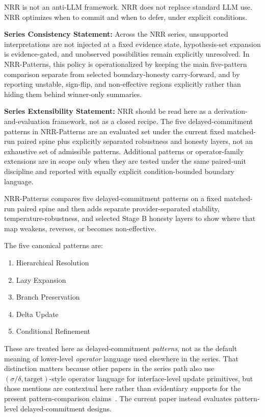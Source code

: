 \documentclass[11pt,a4paper]{article}
\begin{document}
NRR is not an anti-LLM framework.
NRR does not replace standard LLM use.
NRR optimizes when to commit and when to defer, under explicit conditions.

\textbf{Series Consistency Statement:}
Across the NRR series, unsupported interpretations are not injected at a fixed evidence state, hypothesis-set expansion is evidence-gated, and unobserved possibilities remain explicitly unresolved. In NRR-Patterns, this policy is operationalized by keeping the main five-pattern comparison separate from selected boundary-honesty carry-forward, and by reporting unstable, sign-flip, and non-effective regions explicitly rather than hiding them behind winner-only summaries.

\textbf{Series Extensibility Statement:}
NRR should be read here as a derivation-and-evaluation framework, not as a closed recipe. The five delayed-commitment patterns in NRR-Patterns are an evaluated set under the current fixed matched-run paired spine plus explicitly separated robustness and honesty layers, not an exhaustive set of admissible patterns. Additional patterns or operator-family extensions are in scope only when they are tested under the same paired-unit discipline and reported with equally explicit condition-bounded boundary language.

NRR-Patterns compares five delayed-commitment patterns on a fixed matched-run paired spine and then adds separate provider-separated stability, temperature-robustness, and selected Stage B honesty layers to show where that map weakens, reverses, or becomes non-effective.

The five canonical patterns are:
\begin{enumerate}
  \item Hierarchical Resolution
  \item Lazy Expansion
  \item Branch Preservation
  \item Delta Update
  \item Conditional Refinement
\end{enumerate}

These are treated here as delayed-commitment \emph{patterns}, not as the default meaning of lower-level \emph{operator} language used elsewhere in the series. That distinction matters because other papers in the series path also use \((\sigma/\delta,\text{target})\)-style operator language for interface-level update primitives, but those mentions are contextual here rather than evidentiary supports for the present pattern-comparison claims~\cite{saito2026phi,saito2026transfer,saito2026coupled}. The current paper instead evaluates pattern-level delayed-commitment designs.
\end{document}
